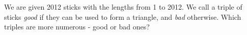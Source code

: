 \problem
We are given 2012 sticks with the lengths from 1 to 2012.
We call a triple of sticks \emph{good} if they can be used to form a triangle,
and \emph{bad} otherwise.
Which triples are more numerous - good or bad ones?
\solution
\endproblem
